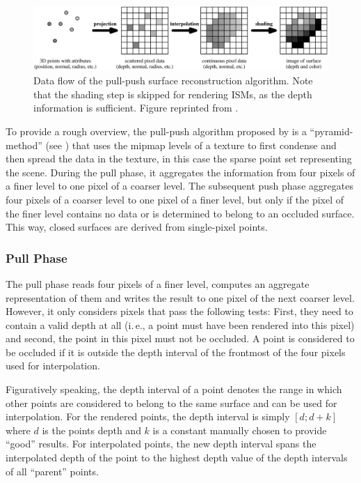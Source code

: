\begin{figure}[htb]
\centering
    \includegraphics[width=\textwidth]{graphics/pullpush_dataflow_marroquim}
  \caption{Data flow of the pull-push surface reconstruction algorithm. Note that the shading step is skipped for rendering ISMs, as the depth information is sufficient. Figure reprinted from \citet{Marroquim:2007:reconstruction}.}
  \label{fig:concept:pull_push_dataflow_marroquim}
\end{figure}


To provide a rough overview, the pull-push algorithm proposed by \citet{Marroquim:2007:reconstruction} is a ``pyramid-method'' (see \cite{Strengert:2006:Pyramid}) that uses the mipmap levels of a texture to first condense and then spread the data in the texture, in this case the sparse point set representing the scene. During the pull phase, it aggregates the information from four pixels of a finer level to one pixel of a coarser level. The subsequent push phase aggregates four pixels of a coarser level to one pixel of a finer level, but only if the pixel of the finer level contains no data or is determined to belong to an occluded surface. This way, closed surfaces are derived from single-pixel points.


\subsubsection{Pull Phase}
The pull phase reads four pixels of a finer level, computes an aggregate representation of them and writes the result to one pixel of the next coarser level. However, it only considers pixels that pass the following tests: First, they need to contain a valid depth at all (i.\,e., a point must have been rendered into this pixel) and second, the point in this pixel must not be occluded. A point is considered to be occluded if it is outside the depth interval of the frontmost of the four pixels used for interpolation.

Figuratively speaking, the depth interval of a point denotes the range in which other points are considered to belong to the same surface and can be used for interpolation. For the rendered points, the depth interval is simply $[d;d+k]$ where $d$ is the points depth and $k$ is a constant manually chosen to provide ``good'' results. For interpolated points, the new depth interval spans the interpolated depth of the point to the highest depth value of the depth intervals of all ``parent'' points.


